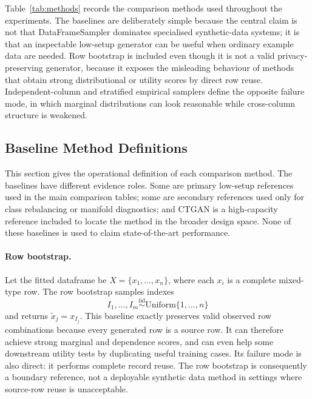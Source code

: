 Table~\ref{tab:methods} records the comparison methods used throughout the
experiments. The baselines are deliberately simple because the central claim is
not that DataFrameSampler dominates specialised synthetic-data systems; it is
that an inspectable low-setup generator can be useful when ordinary example
data are needed. Row bootstrap is included even though it is not a valid
privacy-preserving generator, because it exposes the misleading behaviour of
methods that obtain strong distributional or utility scores by direct row
reuse. Independent-column and stratified empirical samplers define the opposite
failure mode, in which marginal distributions can look reasonable while
cross-column structure is weakened.



\subsection{Baseline Method Definitions}
\label{app:baseline-definitions}

This section gives the operational definition of each comparison method. The
baselines have different evidence roles. Some are primary low-setup references
used in the main comparison tables; some are secondary references used only for
class rebalancing or manifold diagnostics; and CTGAN is a high-capacity
reference included to locate the method in the broader design space. None of
these baselines is used to claim state-of-the-art performance.

\paragraph{Row bootstrap.}
Let the fitted dataframe be
$X=\{x_1,\ldots,x_n\}$, where each $x_i$ is a complete mixed-type row. The row
bootstrap samples indexes
\[
  I_1,\ldots,I_m \overset{\mathrm{iid}}{\sim}
  \mathrm{Uniform}\{1,\ldots,n\}
\]
and returns $\widetilde{x}_j=x_{I_j}$. This baseline exactly preserves valid
observed row combinations because every generated row is a source row. It can
therefore achieve strong marginal and dependence scores, and can even help
some downstream utility tests by duplicating useful training cases. Its
failure mode is also direct: it performs complete record reuse. The row
bootstrap is consequently a boundary reference, not a deployable synthetic
data method in settings where source-row reuse is unacceptable.

